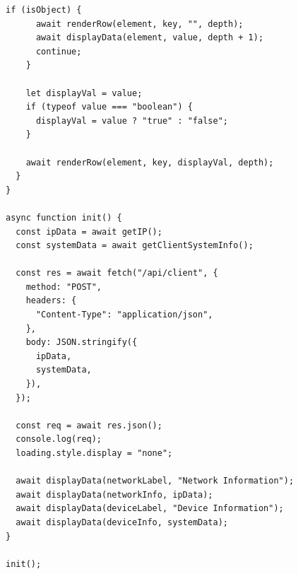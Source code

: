 \documentclass[a4paper]{article}
\begin{document}
\begin{lstlisting}[language={}]
    if (isObject) {
      await renderRow(element, key, "", depth);
      await displayData(element, value, depth + 1);
      continue;
    }

    let displayVal = value;
    if (typeof value === "boolean") {
      displayVal = value ? "true" : "false";
    }

    await renderRow(element, key, displayVal, depth);
  }
}

async function init() {
  const ipData = await getIP();
  const systemData = await getClientSystemInfo();

  const res = await fetch("/api/client", {
    method: "POST",
    headers: {
      "Content-Type": "application/json",
    },
    body: JSON.stringify({
      ipData,
      systemData,
    }),
  });

  const req = await res.json();
  console.log(req);
  loading.style.display = "none";

  await displayData(networkLabel, "Network Information");
  await displayData(networkInfo, ipData);
  await displayData(deviceLabel, "Device Information");
  await displayData(deviceInfo, systemData);
}

init();
\end{lstlisting}
\end{document}
